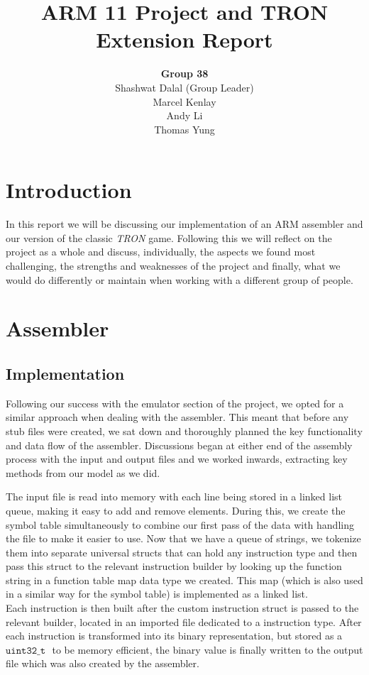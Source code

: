 \documentclass[11pt]{article}
\begin{document}
\title{ARM 11 Project and TRON Extension Report}
\author{\textbf{Group 38}\\
Shashwat Dalal (Group Leader)\\
Marcel Kenlay\\
Andy Li\\
Thomas Yung}



\maketitle


\section{Introduction}

In this report we will be discussing our implementation of an ARM assembler and our version of the classic \textit{TRON} game.
Following this we will reflect on the project as a whole and discuss, individually, the aspects we found most challenging, the strengths and weaknesses of the project and finally, what we would do differently or maintain when working with a different group of people.



\section{Assembler}

\subsection{Implementation}
Following our success with the emulator section of the project, we opted for a similar approach when dealing with the assembler. This meant that before any stub files were created, we sat down and thoroughly planned the key functionality and data flow of the assembler. Discussions began at either end of the assembly process with the input and output files and we worked inwards, extracting key methods from our model as we did.\par
The input file is read into memory with each line being stored in a linked list queue, making it easy to add and remove elements. During this, we create the symbol table simultaneously to combine our first pass of the data with handling the file to make it easier to use. Now that we have a queue of strings, we tokenize them into separate universal structs that can hold any instruction type and then pass this struct to the relevant instruction builder by looking up the function string in a function table map data type we created. This map (which is also used in a similar way for the symbol table) is implemented as a linked list.\\
Each instruction is then built after the custom instruction struct is passed to the relevant builder, located in an imported file dedicated to a instruction type. After each instruction is transformed into its binary representation, but stored as a $\texttt{uint32\_t }$ to be memory efficient, the binary value is finally written to the output file which was also created by the assembler.\par
\end{document}

